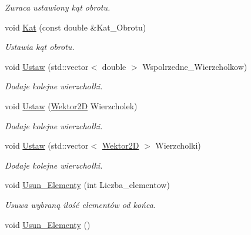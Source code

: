 \begin{DoxyCompactItemize}
\begin{DoxyCompactList}\small\item\em Zwraca ustawiony kąt obrotu. \end{DoxyCompactList}\item 
\hypertarget{class_objekt___graficzny_ae2da90c757c1b9052dd8ffa692a09caf}{void \hyperlink{class_objekt___graficzny_ae2da90c757c1b9052dd8ffa692a09caf}{Kat} (const double \&Kat\+\_\+\+Obrotu)}\label{class_objekt___graficzny_ae2da90c757c1b9052dd8ffa692a09caf}

\begin{DoxyCompactList}\small\item\em Ustawia kąt obrotu. \end{DoxyCompactList}\item 
void \hyperlink{class_objekt___graficzny_a8696af86777439596367520e67e824b9}{Ustaw} (std\+::vector$<$ double $>$ Wspolrzedne\+\_\+\+Wierzcholkow)
\begin{DoxyCompactList}\small\item\em Dodaje kolejne wierzchołki. \end{DoxyCompactList}\item 
void \hyperlink{class_objekt___graficzny_aa53a8a0cb8886e4aeb0b843d7bfff53a}{Ustaw} (\hyperlink{class_wektor2_d}{Wektor2\+D} Wierzcholek)
\begin{DoxyCompactList}\small\item\em Dodaje kolejne wierzchołki. \end{DoxyCompactList}\item 
void \hyperlink{class_objekt___graficzny_aea7b281802a335bc075a09a570538b5c}{Ustaw} (std\+::vector$<$ \hyperlink{class_wektor2_d}{Wektor2\+D} $>$ Wierzcholki)
\begin{DoxyCompactList}\small\item\em Dodaje kolejne wierzchołki. \end{DoxyCompactList}\item 
void \hyperlink{class_objekt___graficzny_aec73cbdb6b8e8519dd9f418a37072ae3}{Usun\+\_\+\+Elementy} (int Liczba\+\_\+elementow)
\begin{DoxyCompactList}\small\item\em Usuwa wybraną ilość elementów od końca. \end{DoxyCompactList}\item 
\hypertarget{class_objekt___graficzny_aa508473ea86c48f2d0acb5339f47177d}{void \hyperlink{class_objekt___graficzny_aa508473ea86c48f2d0acb5339f47177d}{Usun\+\_\+\+Elementy} ()}\label{class_objekt___graficzny_aa508473ea86c48f2d0acb5339f47177d}


\end{DoxyCompactItemize}
